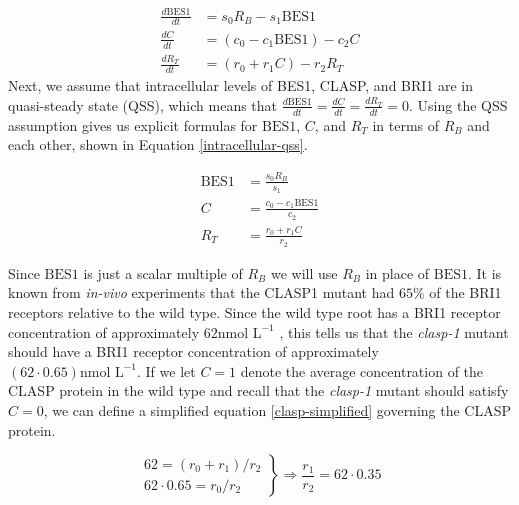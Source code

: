 \documentclass[referee,pdflatex,sn-mathphys-num]{sn-jnl}
\begin{document}
\begin{appendices}
\begin{equation}
\label{intracellular-ode}
\begin{aligned}
  \frac{ d\text{BES1} }{ dt } &= s_{0}R_{B} - s_{1} \text{BES1} \\[5pt]
  \frac{ dC }{ dt } &= (c_{0} - c_{1}\text{BES1}) - c_{2}C \\[5pt]
  \frac{ dR_{T} }{ dt } &= (r_{0}  + r_{1}C) - r_{2}R_{T}
\end{aligned}
\end{equation}
Next, we assume that intracellular levels of BES1, CLASP, and BRI1 are in quasi-steady state (QSS), which means that $\frac{d\text{BES1}}{dt} = \frac{dC}{dt} = \frac{dR_{T}}{dt} = 0$.
Using the QSS assumption gives us explicit formulas for $\text{BES1}$, $C$, and $R_{T}$ in terms of $R_{B}$ and each other, shown in Equation \eqref{intracellular-qss}. 

\begin{equation}
\label{intracellular-qss}
\begin{aligned}
  \text{BES1} &= \frac{ s_{0} R_{B}}{ s_{1} } \\[5pt]
  C &= \frac{ c_{0} - c_{1}\text{BES1} }{ c_{2} } \\[5pt]
  R_{T} &=\frac{ r_{0} + r_{1}C }{r_{2} } 
\end{aligned}
\end{equation}

Since $\text{BES1}$ is just a scalar multiple of $R_{B}$ we will use $R_{B}$ in place of $\text{BES1}$.
It is known from \emph{in-vivo} experiments \cite{ruan2018} that the CLASP1 mutant had $65\%$ of the BRI1 receptors relative to the wild type.
Since the wild type root has a BRI1 receptor concentration of approximately $62\text{nmol L}^{ -1 }$ \cite{vanesse2012}, this tells us that the \emph{clasp-1} mutant should have a BRI1 receptor concentration of approximately $(62 \cdot 0.65)\text{nmol L}^{ -1 }$.
If we let $C = 1$ denote the average concentration of the CLASP protein in the wild type and recall that the \emph{clasp-1} mutant should satisfy $C = 0$, we can define a simplified equation \eqref{clasp-simplified} governing the CLASP protein.

\begin{equation}
\label{clasp-simplified}
\left.\begin{aligned}
  62 = (r_{0} + r_{1}) / r_{2} \\
  62 \cdot 0.65 = r_{0} / r_{2}
\end{aligned}\right\rbrace \Rightarrow  \frac{r_{1}}{r_{2}} = 62 \cdot 0.35
\end{equation}


\end{appendices}
\end{document}
